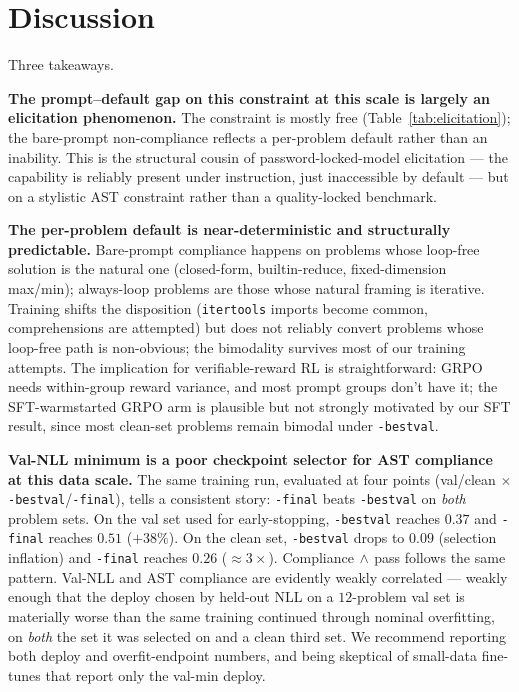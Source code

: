 \documentclass[11pt]{article}
\begin{document}
\section{Discussion}
\label{sec:discussion}

Three takeaways.

\textbf{The prompt--default gap on this constraint at this scale is largely an elicitation phenomenon.} The constraint is mostly free (Table~\ref{tab:elicitation}); the bare-prompt non-compliance reflects a per-problem default rather than an inability. This is the structural cousin of password-locked-model elicitation \citep{greenblatt2024passwordlocked} --- the capability is reliably present under instruction, just inaccessible by default --- but on a stylistic AST constraint rather than a quality-locked benchmark.

\textbf{The per-problem default is near-deterministic and structurally predictable.} Bare-prompt compliance happens on problems whose loop-free solution is the natural one (closed-form, builtin-reduce, fixed-dimension max/min); always-loop problems are those whose natural framing is iterative. Training shifts the disposition (\texttt{itertools} imports become common, comprehensions are attempted) but does not reliably convert problems whose loop-free path is non-obvious; the bimodality survives most of our training attempts. The implication for verifiable-reward RL is straightforward: GRPO needs within-group reward variance, and most prompt groups don't have it; the SFT-warmstarted GRPO arm is plausible but not strongly motivated by our SFT result, since most clean-set problems remain bimodal under \texttt{-bestval}.

\textbf{Val-NLL minimum is a poor checkpoint selector for AST compliance at this data scale.} The same training run, evaluated at four points (val/clean $\times$ \texttt{-bestval}/\texttt{-final}), tells a consistent story: \texttt{-final} beats \texttt{-bestval} on \emph{both} problem sets. On the val set used for early-stopping, \texttt{-bestval} reaches $0.37$ and \texttt{-final} reaches $0.51$ ($+38\%$). On the clean set, \texttt{-bestval} drops to $0.09$ (selection inflation) and \texttt{-final} reaches $0.26$ ($\approx 3\times$). Compliance$\,\wedge\,$pass follows the same pattern. Val-NLL and AST compliance are evidently weakly correlated --- weakly enough that the deploy chosen by held-out NLL on a $12$-problem val set is materially worse than the same training continued through nominal overfitting, on \emph{both} the set it was selected on and a clean third set. We recommend reporting both deploy and overfit-endpoint numbers, and being skeptical of small-data fine-tunes that report only the val-min deploy.
\end{document}
